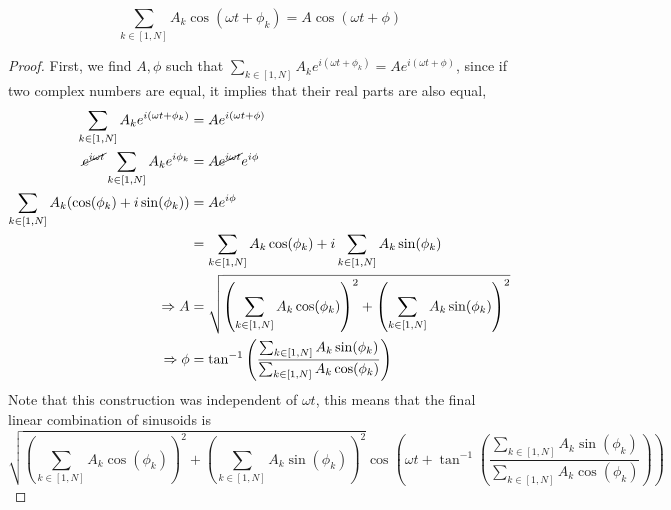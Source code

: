 \documentclass{article}
\begin{document}
\begin{theorem}
    \begin{equation}
        \sum_{k \in [1, N]} A_k \cos(\omega t + \phi_k) = A \cos(\omega t + \phi)
    \end{equation}
\end{theorem}
\begin{proof}
    First, we find \(A, \phi\) such that \(\sum_{k \in [1, N]} A_k e^{i (\omega t + \phi_k)} = A e^{i (\omega t + \phi)}\), since if two complex numbers are equal, it implies that their real parts are also equal,
    \begin{align}
        \sum_{k \in [1, N]} A_k e^{i (\omega t + \phi_k)} &= A e^{i (\omega t + \phi)} \\
        \cancel{e^{i \omega t}} \sum_{k \in [1, N]} A_k e^{i \phi_k} &= A \cancel{e^{i \omega t}} e^{i \phi} \\
        \sum_{k \in [1, N]} A_k (\cos(\phi_k) + i \sin(\phi_k)) &= A e^{i \phi} \\
        &= \sum_{k \in [1, N]} A_k \cos(\phi_k) + i \sum_{k \in [1, N]} A_k \sin(\phi_k) \\
        \Rightarrow A &= \sqrt{\left(\sum_{k \in [1, N]} A_k \cos(\phi_k)\right)^2 + \left(\sum_{k \in [1, N]} A_k \sin(\phi_k)\right)^2} \\
        \Rightarrow \phi &= \tan^{-1}\left(\frac{\sum_{k \in [1, N]} A_k \sin(\phi_k)}{\sum_{k \in [1, N]} A_k \cos(\phi_k)}\right)
    \end{align}
    Note that this construction was independent of \(\omega t\), this means that the final linear combination of sinusoids is
    \begin{equation}
        \sqrt{\left(\sum_{k \in [1, N]} A_k \cos(\phi_k)\right)^2 + \left(\sum_{k \in [1, N]} A_k \sin(\phi_k)\right)^2} \cos\left(\omega t + \tan^{-1}\left(\frac{\sum_{k \in [1, N]} A_k \sin(\phi_k)}{\sum_{k \in [1, N]} A_k \cos(\phi_k)}\right)
\right)
    \end{equation}
\end{proof}
\end{document}
